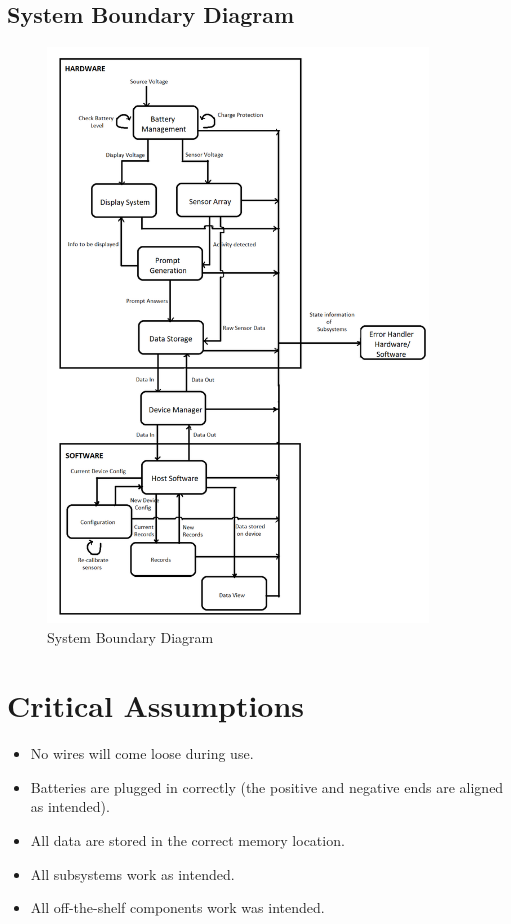 \documentclass{article}
\begin{document}
\subsection{System Boundary Diagram}
\begin{figure}[H]
	\begin{center}
		\includegraphics[width=0.90\textwidth]{SystemBoundaryDiagram}
		\caption{System Boundary Diagram}
		\label{Fig_SBD}
	\end{center}
\end{figure}


\section{Critical Assumptions }

\begin{itemize}
	\item No wires will come loose during use.
	\item Batteries are plugged in correctly (the positive and negative ends are aligned as intended).
	\item All data are stored in the correct memory location.
	\item All subsystems work as intended.
	\item All off-the-shelf components work was intended.
\end{itemize}
\end{document}

